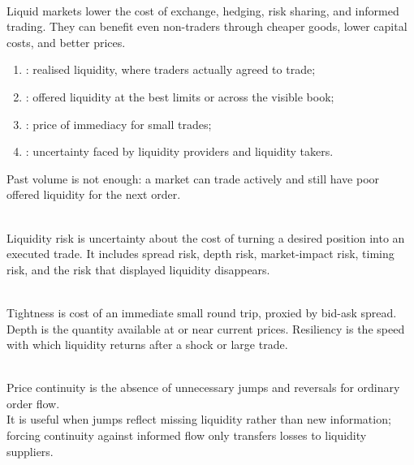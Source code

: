 \begin{mechanism} \\
Liquid markets lower the cost of exchange, hedging, risk sharing, and informed trading. They can benefit even non-traders through cheaper goods, lower capital costs, and better prices.
\end{mechanism}

\begin{taxonomy} 
\begin{enumerate}[label=\roman*.]
\setlength{\itemsep}{0pt}
\item {}: realised liquidity, where traders actually agreed to trade;
\item {}: offered liquidity at the best limits or across the visible book;
\item {}: price of immediacy for small trades;
\item {}: uncertainty faced by liquidity providers and liquidity takers.
\end{enumerate}
Past volume is not enough: a market can trade actively and still have poor offered liquidity for the next order.
\end{taxonomy}

\begin{definition} \\
Liquidity risk is uncertainty about the cost of turning a desired position into an executed trade. It includes spread risk, depth risk, market-impact risk, timing risk, and the risk that displayed liquidity disappears.
\end{definition}

\begin{taxonomy} \\
Tightness is cost of an immediate small round trip, proxied by bid-ask spread. Depth is the quantity available at or near current prices. Resiliency is the speed with which liquidity returns after a shock or large trade.
\end{taxonomy}

\begin{definition} \\
Price continuity is the absence of unnecessary jumps and reversals for ordinary order flow.\\
It is useful when jumps reflect missing liquidity rather than new information; forcing continuity against informed flow only transfers losses to liquidity suppliers.
\end{definition}

